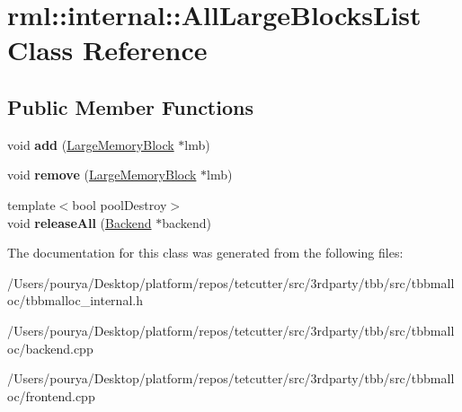 \hypertarget{classrml_1_1internal_1_1AllLargeBlocksList}{}\section{rml\+:\+:internal\+:\+:All\+Large\+Blocks\+List Class Reference}
\label{classrml_1_1internal_1_1AllLargeBlocksList}
\subsection*{Public Member Functions}
\begin{DoxyCompactItemize}
\item 
\hypertarget{classrml_1_1internal_1_1AllLargeBlocksList_ae77cbb92ff95286e5251fbeb934194d3}{}void {\bfseries add} (\hyperlink{structrml_1_1internal_1_1LargeMemoryBlock}{Large\+Memory\+Block} $\ast$lmb)\label{classrml_1_1internal_1_1AllLargeBlocksList_ae77cbb92ff95286e5251fbeb934194d3}

\item 
\hypertarget{classrml_1_1internal_1_1AllLargeBlocksList_a04270a862cfd9b27610a33e96d6d21fd}{}void {\bfseries remove} (\hyperlink{structrml_1_1internal_1_1LargeMemoryBlock}{Large\+Memory\+Block} $\ast$lmb)\label{classrml_1_1internal_1_1AllLargeBlocksList_a04270a862cfd9b27610a33e96d6d21fd}

\item 
\hypertarget{classrml_1_1internal_1_1AllLargeBlocksList_a93202fa088a712fbdba4c671bab8f015}{}{\footnotesize template$<$bool pool\+Destroy$>$ }\\void {\bfseries release\+All} (\hyperlink{classrml_1_1internal_1_1Backend}{Backend} $\ast$backend)\label{classrml_1_1internal_1_1AllLargeBlocksList_a93202fa088a712fbdba4c671bab8f015}

\end{DoxyCompactItemize}


The documentation for this class was generated from the following files\+:\begin{DoxyCompactItemize}
\item 
/\+Users/pourya/\+Desktop/platform/repos/tetcutter/src/3rdparty/tbb/src/tbbmalloc/tbbmalloc\+\_\+internal.\+h\item 
/\+Users/pourya/\+Desktop/platform/repos/tetcutter/src/3rdparty/tbb/src/tbbmalloc/backend.\+cpp\item 
/\+Users/pourya/\+Desktop/platform/repos/tetcutter/src/3rdparty/tbb/src/tbbmalloc/frontend.\+cpp\end{DoxyCompactItemize}
